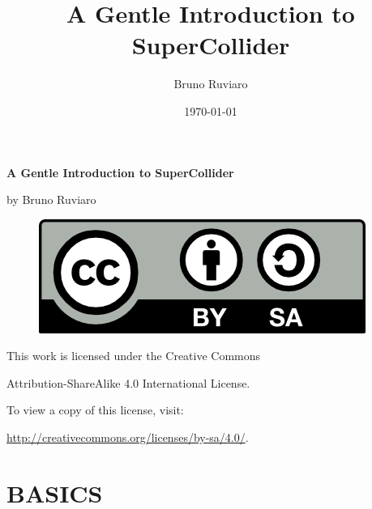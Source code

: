 \documentclass[11pt]{article}
\title{\textbf{A Gentle Introduction to SuperCollider}}
\author{Bruno Ruviaro}
\date{\today}
\begin{document}
\vspace*{\fill}
\begin{center}
{\LARGE \textbf{A Gentle Introduction to SuperCollider}}

\bigskip
by Bruno Ruviaro


\bigskip
\bigskip

\begin{figure}[h]
\begin{center}
\includegraphics[scale=1]{fig-by-sa.png}
\end{center}
\end{figure}

\bigskip
This work is licensed under the Creative Commons

Attribution-ShareAlike 4.0 International License.

To view a copy of this license, visit:

\url{http://creativecommons.org/licenses/by-sa/4.0/}.
\end{center}
\vspace*{\fill}
\thispagestyle{empty}
\clearpage

\tableofcontents
\maketitle
{}


\part{BASICS}












\newpage
\end{document}
